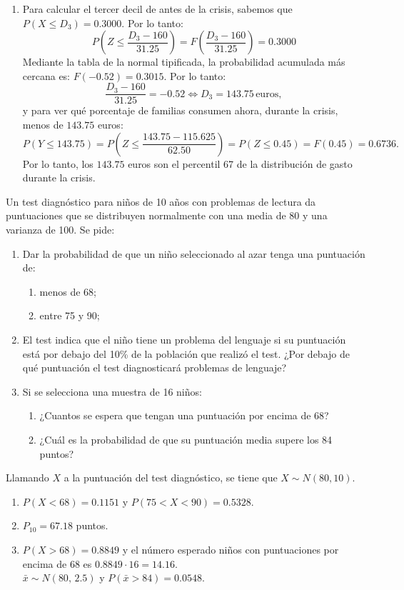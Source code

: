 {\begin{enumerate}
\item Para calcular el tercer decil de antes de la crisis, sabemos que $P(X\leq D_3)=0.3000$. Por lo tanto:
\[
P\left( {Z \le \frac{{D_3  - 160}}{{31.25}}} \right) = F\left( {\frac{{D_3  - 160}}{{31.25}}} \right) = 0.3000
\]
Mediante la tabla de la normal tipificada, la probabilidad acumulada más cercana es: $F(-0.52)=0.3015$. Por lo tanto:
\[
\frac{{D_3  - 160}}{{31.25}} =  - 0.52 \Leftrightarrow D_3  = 143.75\,\mbox{euros},
\]
y para ver qué porcentaje de familias consumen ahora, durante la crisis, menos de $143.75$ euros:
\[
P(Y \le 143.75) = P\left( {Z \le \frac{{143.75 - 115.625}}{{62.50}}} \right) = P(Z \le 0.45) = F(0.45) = 0.6736.
\]
Por lo tanto, los $143.75$ euros son el percentil 67 de la distribución de gasto durante la crisis.
\end{enumerate}
}


{Un test diagnóstico para niños de 10 años con problemas de lectura da puntuaciones que se distribuyen normalmente con
una media de 80 y una varianza de 100.
Se pide:
\begin{enumerate}
\item Dar la probabilidad de que un niño seleccionado al azar tenga una puntuación de:
\begin{enumerate}
\item menos de 68;
\item entre 75 y 90;
\end{enumerate}
\item El test indica que el niño tiene un problema del lenguaje si su puntuación está por debajo del 10\% de la
población que realizó el test.
¿Por debajo de qué puntuación el test diagnosticará problemas de lenguaje?
\item Si se selecciona una muestra de 16 niños:
\begin{enumerate}
\item ¿Cuantos se espera que tengan una puntuación por encima de 68?
\item ¿Cuál es la probabilidad de que su puntuación media supere los 84 puntos?
\end{enumerate}
\end{enumerate}
}
{Llamando $X$ a la puntuación del test diagnóstico, se tiene que $X\sim N(80,10)$.
\begin{enumerate}
\item $P(X<68)=0.1151$ y $P(75<X<90)=0.5328$.
\item $P_{10}=67.18$ puntos.
\item $P(X>68)=0.8849$ y el número esperado niños con puntuaciones por encima de 68 es \mbox{$0.8849\cdot 16=14.16$}.\\
$\bar x\sim N(80,\,2.5)$ y $P(\bar x>84)=0.0548$.
\end{enumerate}
}
{}


